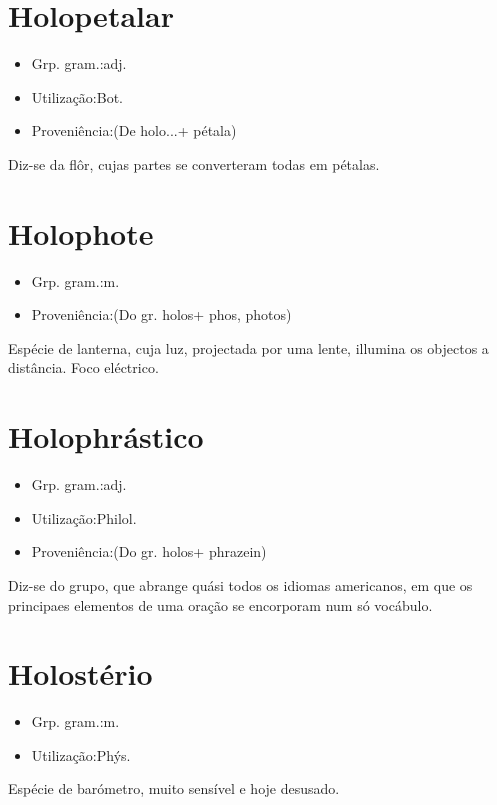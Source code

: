 \documentclass{article}
\begin{document}
\section{Holopetalar}
\begin{itemize}
\item {Grp. gram.:adj.}
\end{itemize}
\begin{itemize}
\item {Utilização:Bot.}
\end{itemize}
\begin{itemize}
\item {Proveniência:(De \textunderscore holo...\textunderscore  + \textunderscore pétala\textunderscore )}
\end{itemize}
Diz-se da flôr, cujas partes se converteram todas em pétalas.
\section{Holophote}
\begin{itemize}
\item {Grp. gram.:m.}
\end{itemize}
\begin{itemize}
\item {Proveniência:(Do gr. \textunderscore holos\textunderscore  + \textunderscore phos\textunderscore , \textunderscore photos\textunderscore )}
\end{itemize}
Espécie de lanterna, cuja luz, projectada por uma lente, illumina os objectos a distância.
Foco eléctrico.
\section{Holophrástico}
\begin{itemize}
\item {Grp. gram.:adj.}
\end{itemize}
\begin{itemize}
\item {Utilização:Philol.}
\end{itemize}
\begin{itemize}
\item {Proveniência:(Do gr. \textunderscore holos\textunderscore  + \textunderscore phrazein\textunderscore )}
\end{itemize}
Diz-se do grupo, que abrange quási todos os idiomas americanos, em que os principaes elementos de uma oração se encorporam num só vocábulo.
\section{Holostério}
\begin{itemize}
\item {Grp. gram.:m.}
\end{itemize}
\begin{itemize}
\item {Utilização:Phýs.}
\end{itemize}
Espécie de barómetro, muito sensível e hoje desusado.
\end{document}

